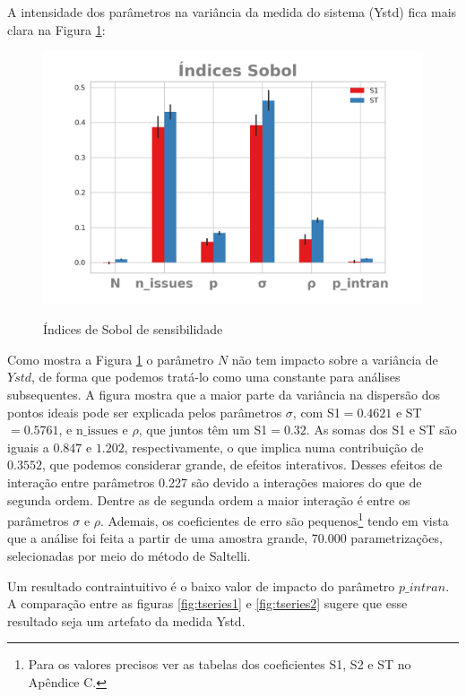 A intensidade dos parâmetros na variância da medida do sistema (Ystd) fica mais
clara na Figura \ref{fig:sobol1}:

\begin{figure}[H]
  \centering
  \caption{Índices de Sobol de sensibilidade}
  \includegraphics{ims/barplotmuto5k.png}
  \label{fig:sobol1}
\end{figure}

Como mostra a Figura \ref{fig:sobol1} o parâmetro \(N\) não tem impacto sobre a
variância de \(Ystd\), de forma que podemos tratá-lo como uma constante para
análises subsequentes. A figura mostra que a maior parte da variância na
dispersão dos pontos ideais pode ser explicada pelos parâmetros \(\sigma\), com
S1\( = 0.4621\) e ST \(= 0.5761\), e \(\text{n\_issues}\) e \(\rho\), que juntos
têm um S1\(= 0.32\). As somas dos S1 e ST são iguais a \(0.847\) e \(1.202\),
respectivamente, o que implica numa contribuição de \(0.3552\), que podemos
considerar grande, de efeitos interativos. Desses efeitos de interação entre
parâmetros 0.227 são devido a interações maiores do que de segunda ordem. Dentre
as de segunda ordem a maior interação é entre os parâmetros \(\sigma\) e
\(\rho\). Ademais, os coeficientes de erro são pequenos\footnote{Para os valores
  precisos ver as tabelas dos coeficientes S1, S2 e ST no Apêndice C.} tendo em
vista que a análise foi feita a partir de uma amostra grande, 70.000
parametrizações, selecionadas por meio do método de Saltelli.

Um resultado contraintuitivo é o baixo valor de impacto do parâmetro
\(p\_intran\). A comparação entre as figuras \ref{fig:tseries1} e
\ref{fig:tseries2} sugere que esse resultado seja um artefato da medida Ystd.

